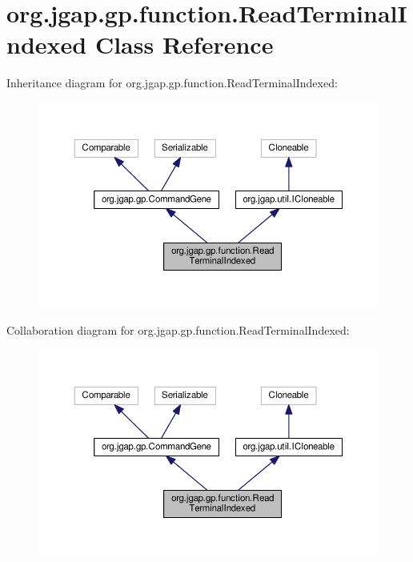 \hypertarget{classorg_1_1jgap_1_1gp_1_1function_1_1_read_terminal_indexed}{\section{org.\-jgap.\-gp.\-function.\-Read\-Terminal\-Indexed Class Reference}
\label{classorg_1_1jgap_1_1gp_1_1function_1_1_read_terminal_indexed}
}


Inheritance diagram for org.\-jgap.\-gp.\-function.\-Read\-Terminal\-Indexed\-:
\nopagebreak
\begin{figure}[H]
\begin{center}
\leavevmode
\includegraphics[width=350pt]{classorg_1_1jgap_1_1gp_1_1function_1_1_read_terminal_indexed__inherit__graph}
\end{center}
\end{figure}


Collaboration diagram for org.\-jgap.\-gp.\-function.\-Read\-Terminal\-Indexed\-:
\nopagebreak
\begin{figure}[H]
\begin{center}
\leavevmode
\includegraphics[width=350pt]{classorg_1_1jgap_1_1gp_1_1function_1_1_read_terminal_indexed__coll__graph}
\end{center}
\end{figure}

